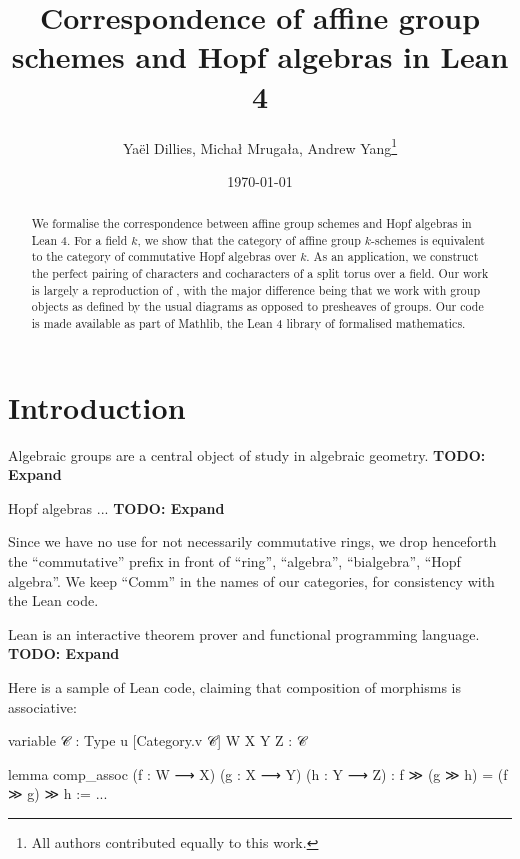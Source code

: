 \documentclass{article}
\title{Correspondence of affine group schemes and Hopf algebras in Lean 4}
\author{Yaël Dillies, Michał Mrugała, Andrew Yang\footnote{All authors contributed equally to this work.}}
\date{\today}
\begin{document}
\maketitle


\begin{abstract}
  We formalise the correspondence between affine group schemes and Hopf algebras in Lean 4.
  For a field $k$, we show that the category of affine group $k$-schemes is equivalent
  to the category of commutative Hopf algebras over $k$.
  As an application, we construct the perfect pairing of characters and cocharacters of a split torus over a field.
  Our work is largely a reproduction of \cite{CrazyAffine},
  with the major difference being that we work with group objects
  as defined by the usual diagrams as opposed to presheaves of groups.
  Our code is made available as part of Mathlib, the Lean 4 library of formalised mathematics.
\end{abstract}


\section{Introduction}\label{sec:intro}


Algebraic groups are a central object of study in algebraic geometry. {\bf TODO: Expand}

Hopf algebras ... {\bf TODO: Expand}

Since we have no use for not necessarily commutative rings, we drop henceforth the ``commutative'' prefix in front of ``ring'', ``algebra'', ``bialgebra'', ``Hopf algebra''.
We keep ``Comm'' in the names of our categories, for consistency with the Lean code.

Lean is an interactive theorem prover and functional programming language. {\bf TODO: Expand}

Here is a sample of Lean code, claiming that composition of morphisms is associative:
\begin{leancode}
  variable {𝒞 : Type u} [Category.{v} 𝒞] {W X Y Z : 𝒞}

  lemma comp_assoc (f : W ⟶ X) (g : X ⟶ Y) (h : Y ⟶ Z) : f ≫ (g ≫ h) = (f ≫ g) ≫ h := ...
\end{leancode}
\end{document}
